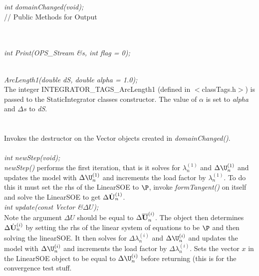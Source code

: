 {\em int domainChanged(void); }\\ 

// Public Methods for Output

\\ 
\\ 
{\em int Print(OPS_Stream \&s, int flag = 0);}


 \\
{\em ArcLength1(double dS, double alpha = 1.0);}\\ 

The integer INTEGRATOR\_TAGS\_ArcLength1 (defined in
$<$classTags.h$>$) is passed to the StaticIntegrator classes
constructor. The value of $\alpha$ is set to {\em alpha} and 
$\Delta s$ to {\em dS}. \\

 \\
\\ 
Invokes the destructor on the Vector objects created in {\em
domainChanged()}. \\

\\

{\em int newStep(void);} \\
{\em newStep()} performs the first iteration, that is it solves for 
$\lambda_n^{(1)}$ and $\Delta \U_n^{(1)}$ and updates the model with
$\Delta \U_n^{(1)}$ and increments the load factor by
$\lambda_n^{(1)}$. To do this it must set the rhs of the LinearSOE to
$\P$, invoke {\em formTangent()} on itself and solve the LinearSOE to
get $\Delta \dot{\bf U}_n^{(1)}$. \\

{\em int update(const Vector \&$\Delta U$);} \\
Note the argument $\Delta U$ should be equal to $\Delta \overline{\bf U}_n^{(i)}$.
The object then determines $\Delta \dot{\bf U}_n^{(i)}$ by setting the rhs of
the linear system of equations to be $\P$ and then solving the
linearSOE. It then solves for
$\Delta \lambda_n^{(i)}$ and $\Delta \U_n^{(i)}$ and updates the model with
$\Delta \U_n^{(i)}$ and increments the load factor by $\Delta
\lambda_n^{(i)}$. Sets the vector $x$ in the LinearSOE object to be
equal to $\Delta \U_n^{(i)}$ before returning (this is for the
convergence test stuff. \\


